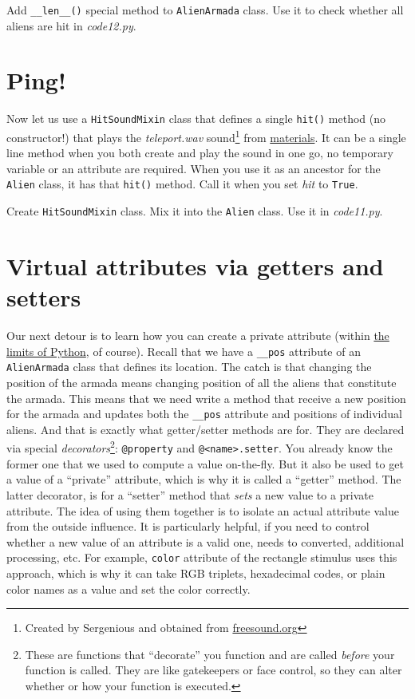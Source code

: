 \documentclass[
]{book}
\begin{document}
Add \texttt{\_\_len\_\_()} special method to \texttt{AlienArmada} class.
Use it to check whether all aliens are hit
in \emph{code12.py}.

\hypertarget{ping}{%
\section{Ping!}\label{ping}}

Now let us use a \texttt{HitSoundMixin} class that defines a single \texttt{hit()} method (no constructor!) that plays the \emph{teleport.wav} sound\footnote{Created by Sergenious and obtained from \href{https://freesound.org/people/Sergenious/sounds/55853/}{freesound.org}} from \href{material/space-invaders.zip}{materials}. It can be a single line method when you both create and play the sound in one go, no temporary variable or an attribute are required. When you use it as an ancestor for the \texttt{Alien} class, it has that \texttt{hit()} method. Call it when you set \emph{hit} to \texttt{True}.

Create \texttt{HitSoundMixin} class.
Mix it into the \texttt{Alien} class.
Use it in \emph{code11.py}.

\hypertarget{getter-setter}{%
\section{Virtual attributes via getters and setters}\label{getter-setter}}

Our next detour is to learn how you can create a private attribute (within \protect\hyperlink{access-restrictions}{the limits of Python}, of course). Recall that we have a \texttt{\_\_pos} attribute of an \texttt{AlienArmada} class that defines its location. The catch is that changing the position of the armada means changing position of all the aliens that constitute the armada. This means that we need write a method that receive a new position for the armada and updates both the \texttt{\_\_pos} attribute and positions of individual aliens. And that is exactly what getter/setter methods are for. They are declared via special \emph{decorators}\footnote{These are functions that ``decorate'' you function and are called \emph{before} your function is called. They are like gatekeepers or face control, so they can alter whether or how your function is executed.}: \texttt{@property} and \texttt{@\textless{}name\textgreater{}.setter}. You already know the former one that we used to compute a value on-the-fly. But it also be used to get a value of a ``private'' attribute, which is why it is called a ``getter'' method. The latter decorator, is for a ``setter'' method that \emph{sets} a new value to a private attribute. The idea of using them together is to isolate an actual attribute value from the outside influence. It is particularly helpful, if you need to control whether a new value of an attribute is a valid one, needs to converted, additional processing, etc. For example, \texttt{color} attribute of the rectangle stimulus uses this approach, which is why it can take RGB triplets, hexadecimal codes, or plain color names as a value and set the color correctly.
\end{document}
